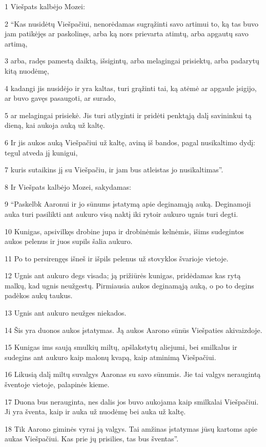 \par 1 Viešpats kalbėjo Mozei: 
\par 2 “Kas nusidėtų Viešpačiui, nenorėdamas sugrąžinti savo artimui to, ką tas buvo jam patikėjęs ar paskolinęs, arba ką nors prievarta atimtų, arba apgautų savo artimą, 
\par 3 arba, radęs pamestą daiktą, išsigintų, arba melagingai prisiektų, arba padarytų kitą nuodėmę, 
\par 4 kadangi jis nusidėjo ir yra kaltas, turi grąžinti tai, ką atėmė ar apgaule įsigijo, ar buvo gavęs pasaugoti, ar surado, 
\par 5 ar melagingai prisiekė. Jis turi atlyginti ir pridėti penktąją dalį savininkui tą dieną, kai aukoja auką už kaltę. 
\par 6 Ir jis aukos auką Viešpačiui už kaltę, aviną iš bandos, pagal nusikaltimo dydį: tegul atveda jį kunigui, 
\par 7 kuris sutaikins jį su Viešpačiu, ir jam bus atleistas jo nusikaltimas”. 
\par 8 Ir Viešpats kalbėjo Mozei, sakydamas: 
\par 9 “Paskelbk Aaronui ir jo sūnums įstatymą apie deginamąją auką. Deginamoji auka turi pasilikti ant aukuro visą naktį iki ryto­ir aukuro ugnis turi degti. 
\par 10 Kunigas, apsivilkęs drobine jupa ir drobinėmis kelnėmis, išims sudegintos aukos pelenus ir juos supils šalia aukuro. 
\par 11 Po to persirengęs išneš ir išpils pelenus už stovyklos švarioje vietoje. 
\par 12 Ugnis ant aukuro degs visada; ją prižiūrės kunigas, pridėdamas kas rytą malkų, kad ugnis neužgestų. Pirmiausia aukos deginamąją auką, o po to degins padėkos aukų taukus. 
\par 13 Ugnis ant aukuro neužges niekados. 
\par 14 Šis yra duonos aukos įstatymas. Ją aukos Aarono sūnūs Viešpaties akivaizdoje. 
\par 15 Kunigas ims saują smulkių miltų, apšlakstytų aliejumi, bei smilkalus ir sudegins ant aukuro kaip malonų kvapą, kaip atminimą Viešpačiui. 
\par 16 Likusią dalį miltų suvalgys Aaronas su savo sūnumis. Jie tai valgys neraugintą šventoje vietoje, palapinės kieme. 
\par 17 Duona bus nerauginta, nes dalis jos buvo aukojama kaip smilkalai Viešpačiui. Ji yra šventa, kaip ir auka už nuodėmę bei auka už kaltę. 
\par 18 Tik Aarono giminės vyrai ją valgys. Tai amžinas įstatymas jūsų kartoms apie aukas Viešpačiui. Kas prie jų prisilies, tas bus šventas”. 
